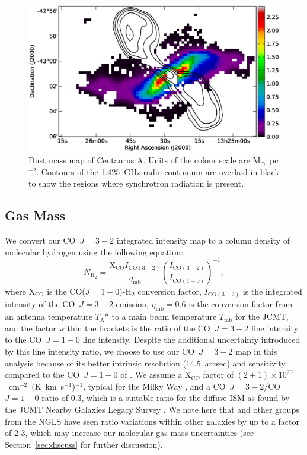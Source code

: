 \documentclass[useAMS,usenatbib,usegraphicx]{mn2e}
\begin{document}
\begin{figure}
\includegraphics[width=15cm]{Fig5_CenA_dust_mass}
\caption{Dust mass map of Centaurus A.  Units of the colour scale are M$_{\odot}$~pc$^{-2}$.  Contours of the 1.425~GHz radio continuum are overlaid in black to show the regions where synchrotron radiation is present.}
\label{fig:dust_mass}
\end{figure}

\subsection{Gas Mass}\label{subsec:gas}
We convert our CO~$J=3-2$ integrated intensity map to a column density of molecular hydrogen using the following equation:
\begin{equation}\label{eqn:CO_col_density}
N_{\mathrm{H}_{2}} = \frac{\mathrm{X}_{\mathrm{CO}} I_{\mathrm{CO}(3-2)}}{\eta_{\mathrm{mb}}} \left(\frac{I_{\mathrm{CO}(3-2)}}{I_{\mathrm{CO}(1-0)}}\right)^{-1},
\end{equation}
where X$_{\mathrm{CO}}$ is the CO($J=1-0$)-H$_{2}$ conversion factor, $I_{\mathrm{CO}(3-2)}$ is the integrated intensity of the CO~$J=3-2$ emission, $\eta_{\mathrm{mb}}=0.6$ is the conversion factor from an antenna temperature $T_{\mathrm{A}}$* to a main beam temperature $T_{\mathrm{mb}}$ for the JCMT, and the factor within the brackets is the ratio of the CO~$J=3-2$ line intensity to the CO~$J=1-0$ line intensity.  Despite the additional uncertainty introduced by this line intensity ratio, we choose to use our CO~$J=3-2$ map in this analysis because of its better intrinsic resolution (14.5~arcsec) and sensitivity compared to the CO~$J=1-0$ of \citet{1990ApJ...363..451E}.  We assume a X$_{\mathrm{CO}}$ factor of $(2 \pm 1) \times 10^{20}$~cm$^{-2}$~(K~km~s$^{-1}$)$^{-1}$, typical for the Milky Way \citep{1988A&A...207....1S}, and a CO~$J=3-2$/CO~$J=1-0$ ratio of 0.3, which is a suitable ratio for the diffuse ISM as found by the JCMT Nearby Galaxies Legacy Survey \citep[NGLS;][]{2009ApJ...693.1736W}.  We note here that \citet{2009ApJ...693.1736W} and other groups from the NGLS have seen ratio variations within other galaxies by up to a factor of 2-3, which may increase our molecular gas mass uncertainties (see Section~\ref{sec:discuss} for further discussion).
\end{document}
